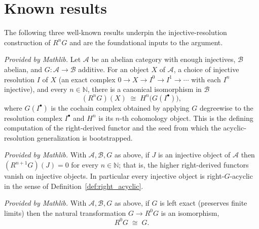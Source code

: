 \section{Known results}

The following three well-known results underpin the injective-resolution
construction of \(R^n G\) and are the foundational inputs to the argument.

\begin{lemma}
  \label{lem:right_derived_injective_resolution}
  \mathlibok
  \textit{Provided by Mathlib.}
  Let \(\mathcal{A}\) be an abelian category with enough injectives,
  \(\mathcal{B}\) abelian, and \(G : \mathcal{A} \to \mathcal{B}\) additive. For an
  object \(X\) of \(\mathcal{A}\), a choice of injective resolution
  \(I\) of \(X\) (an exact complex \(0 \to X \to I^0 \to I^1 \to \cdots\) with each
  \(I^n\) injective), and every \(n \in \mathbb{N}\), there is a canonical
  isomorphism in \(\mathcal{B}\)
  \[
    (R^n G)(X)
      \;\cong\;
      H^n\bigl(G(I^\bullet)\bigr),
  \]
  where \(G(I^\bullet)\) is the cochain complex obtained by applying \(G\)
  degreewise to the resolution complex \(I^\bullet\) and \(H^n\) is its \(n\)-th
  cohomology object. This is the defining computation of the right-derived functor
  and the seed from which the acyclic-resolution generalization is bootstrapped.
\end{lemma}

\begin{lemma}
  \label{lem:right_derived_vanishes_injective}
  \mathlibok
  \textit{Provided by Mathlib.}
  With \(\mathcal{A}, \mathcal{B}, G\) as above, if \(J\) is an injective object of
  \(\mathcal{A}\) then \((R^{n+1} G)(J) = 0\) for every \(n \in \mathbb{N}\); that
  is, the higher right-derived functors vanish on injective objects. In particular
  every injective object is right-\(G\)-acyclic in the sense of
  Definition~\ref{def:right_acyclic}.
\end{lemma}

\begin{lemma}
  \label{lem:right_derived_zero_iso_self}
  \mathlibok
  \textit{Provided by Mathlib.}
  With \(\mathcal{A}, \mathcal{B}, G\) as above, if \(G\) is left exact (preserves
  finite limits) then the natural transformation \(G \to R^0 G\) is an isomorphism,
  \[
    R^0 G \;\cong\; G.
  \]
\end{lemma}

